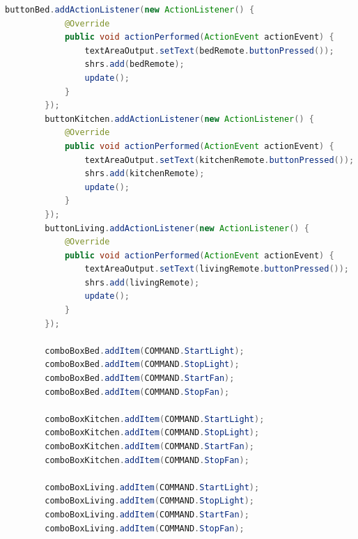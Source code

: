 \documentclass{article}
\begin{document}
\begin{lstlisting}[language=Java]
        buttonBed.addActionListener(new ActionListener() {
            @Override
            public void actionPerformed(ActionEvent actionEvent) {
                textAreaOutput.setText(bedRemote.buttonPressed());
                shrs.add(bedRemote);
                update();
            }
        });
        buttonKitchen.addActionListener(new ActionListener() {
            @Override
            public void actionPerformed(ActionEvent actionEvent) {
                textAreaOutput.setText(kitchenRemote.buttonPressed());
                shrs.add(kitchenRemote);
                update();
            }
        });
        buttonLiving.addActionListener(new ActionListener() {
            @Override
            public void actionPerformed(ActionEvent actionEvent) {
                textAreaOutput.setText(livingRemote.buttonPressed());
                shrs.add(livingRemote);
                update();
            }
        });

        comboBoxBed.addItem(COMMAND.StartLight);
        comboBoxBed.addItem(COMMAND.StopLight);
        comboBoxBed.addItem(COMMAND.StartFan);
        comboBoxBed.addItem(COMMAND.StopFan);

        comboBoxKitchen.addItem(COMMAND.StartLight);
        comboBoxKitchen.addItem(COMMAND.StopLight);
        comboBoxKitchen.addItem(COMMAND.StartFan);
        comboBoxKitchen.addItem(COMMAND.StopFan);

        comboBoxLiving.addItem(COMMAND.StartLight);
        comboBoxLiving.addItem(COMMAND.StopLight);
        comboBoxLiving.addItem(COMMAND.StartFan);
        comboBoxLiving.addItem(COMMAND.StopFan);


\end{lstlisting}
\end{document}
